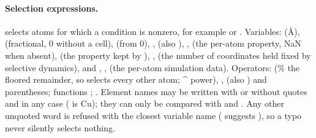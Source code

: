 \paragraph{Selection expressions.}  selects atoms for which a condition is nonzero, for example  or . Variables:  (\AA),  (fractional, 0 without a cell),  (from 0), ,  (also ), ,  (the per-atom property, NaN when absent),  (the property kept by ), ,  (the number of coordinates held fixed by selective dynamics), and , ,  (the per-atom simulation data). Operators: \code{+ - * / \% \^{}} (\% the floored remainder, so  selects every other atom; \^{} power), \code{< <= > >= == !=}, \code{\&\& || !} (also ) and parentheses; functions ; . Element names may be written with or without quotes and in any case ( is Cu); they can only be compared with \code{==} and \code{!=}. Any other unquoted word is refused with the closest variable name ( suggests ), so a typo never silently selects nothing.

